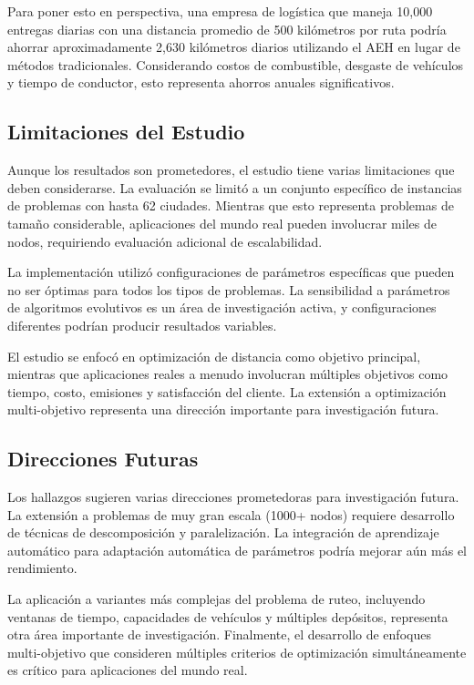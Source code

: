 \documentclass[12pt,a4paper]{article}
\begin{document}
Para poner esto en perspectiva, una empresa de logística que maneja 10,000 entregas diarias con una distancia promedio de 500 kilómetros por ruta podría ahorrar aproximadamente 2,630 kilómetros diarios utilizando el AEH en lugar de métodos tradicionales. Considerando costos de combustible, desgaste de vehículos y tiempo de conductor, esto representa ahorros anuales significativos.

\subsection{Limitaciones del Estudio}

Aunque los resultados son prometedores, el estudio tiene varias limitaciones que deben considerarse. La evaluación se limitó a un conjunto específico de instancias de problemas con hasta 62 ciudades. Mientras que esto representa problemas de tamaño considerable, aplicaciones del mundo real pueden involucrar miles de nodos, requiriendo evaluación adicional de escalabilidad.

La implementación utilizó configuraciones de parámetros específicas que pueden no ser óptimas para todos los tipos de problemas. La sensibilidad a parámetros de algoritmos evolutivos es un área de investigación activa, y configuraciones diferentes podrían producir resultados variables.

El estudio se enfocó en optimización de distancia como objetivo principal, mientras que aplicaciones reales a menudo involucran múltiples objetivos como tiempo, costo, emisiones y satisfacción del cliente. La extensión a optimización multi-objetivo representa una dirección importante para investigación futura.

\subsection{Direcciones Futuras}

Los hallazgos sugieren varias direcciones prometedoras para investigación futura. La extensión a problemas de muy gran escala (1000+ nodos) requiere desarrollo de técnicas de descomposición y paralelización. La integración de aprendizaje automático para adaptación automática de parámetros podría mejorar aún más el rendimiento.

La aplicación a variantes más complejas del problema de ruteo, incluyendo ventanas de tiempo, capacidades de vehículos y múltiples depósitos, representa otra área importante de investigación. Finalmente, el desarrollo de enfoques multi-objetivo que consideren múltiples criterios de optimización simultáneamente es crítico para aplicaciones del mundo real.
\end{document}

